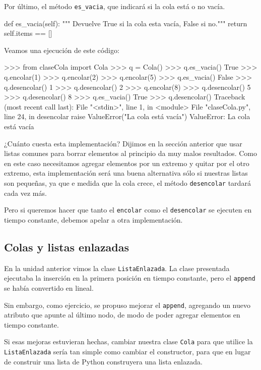 Por último, el método \lstinline!es_vacia!, que indicará si la cola está
o no vacía.

\begin{codigo-python-sn}
    def es_vacia(self):
        """ Devuelve True si la cola esta vacía, False si no."""
        return self.items == []
\end{codigo-python-sn}

Veamos una ejecución de este código:

\begin{codigo-python-sn}
>>> from claseCola import Cola
>>> q = Cola()
>>> q.es_vacia()
True
>>> q.encolar(1)
>>> q.encolar(2)
>>> q.encolar(5)
>>> q.es_vacia()
False
>>> q.desencolar()
1
>>> q.desencolar()
2
>>> q.encolar(8)
>>> q.desencolar()
5
>>> q.desencolar()
8
>>> q.es_vacia()
True
>>> q.desencolar()
Traceback (most recent call last):
  File "<stdin>", line 1, in <module>
  File "claseCola.py", line 24, in desencolar
    raise ValueError("La cola está vacía")
ValueError: La cola está vacía
\end{codigo-python-sn}

¿Cuánto cuesta esta implementación?  Dijimos en la sección anterior que
usar listas comunes para borrar elementos al principio da muy malos
resultados. Como en este caso necesitamos agregar elementos por un extremo
y quitar por el otro extremo, esta implementación será una buena
alternativa sólo si nuestras listas son pequeñas, ya que e medida que la
cola crece, el método \lstinline!desencolar! tardará cada vez más.

Pero si queremos hacer que tanto el \lstinline!encolar! como el
\lstinline!desencolar!  se ejecuten en tiempo constante, debemos apelar a
otra implementación.

\subsection{Colas y listas enlazadas}

En la unidad anterior vimos la clase \lstinline!ListaEnlazada!.
La clase presentada ejecutaba la inserción en la primera posición en
tiempo constante, pero el \lstinline|append| se había convertido en lineal.

Sin embargo, como ejercicio, se propuso mejorar el \lstinline|append|,
agregando un nuevo atributo que apunte al último nodo, de modo de poder
agregar elementos en tiempo constante.

Si esas mejoras estuvieran hechas, cambiar nuestra clase \lstinline!Cola!
para que utilice la \lstinline!ListaEnlazada! sería tan simple como cambiar
el constructor, para que en lugar de construir una lista de Python
construyera una lista enlazada.

